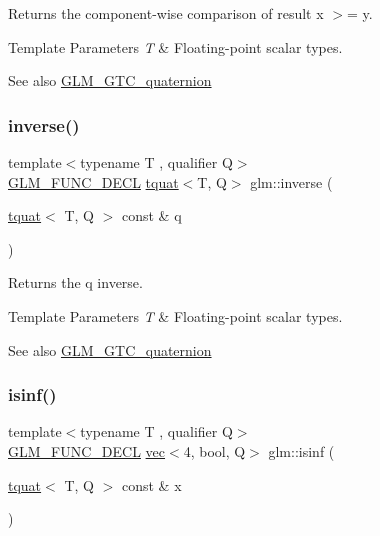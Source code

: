 Returns the component-\/wise comparison of result x $>$= y.


\begin{DoxyTemplParams}{Template Parameters}
{\em T} & Floating-\/point scalar types.\\
\hline
\end{DoxyTemplParams}
\begin{DoxySeeAlso}{See also}
\hyperlink{group__gtc__quaternion}{G\+L\+M\+\_\+\+G\+T\+C\+\_\+quaternion} 
\end{DoxySeeAlso}
\mbox{\label{group__gtc__quaternion_gadc59b59ce71daa5586a64a6acf36c072}} 
\subsubsection{\texorpdfstring{inverse()}{inverse()}}
{\footnotesize\ttfamily template$<$typename T , qualifier Q$>$ \\
\hyperlink{setup_8hpp_ab2d052de21a70539923e9bcbf6e83a51}{G\+L\+M\+\_\+\+F\+U\+N\+C\+\_\+\+D\+E\+CL} \hyperlink{structglm_1_1tquat}{tquat}$<$T, Q$>$ glm\+::inverse (\begin{DoxyParamCaption}\item[{\hyperlink{structglm_1_1tquat}{tquat}$<$ T, Q $>$ const \&}]{q }\end{DoxyParamCaption})}

Returns the q inverse.


\begin{DoxyTemplParams}{Template Parameters}
{\em T} & Floating-\/point scalar types.\\
\hline
\end{DoxyTemplParams}
\begin{DoxySeeAlso}{See also}
\hyperlink{group__gtc__quaternion}{G\+L\+M\+\_\+\+G\+T\+C\+\_\+quaternion} 
\end{DoxySeeAlso}
\mbox{\label{group__gtc__quaternion_ga139abc0f7f89553e341f8be95bf8d3cb}} 
\subsubsection{\texorpdfstring{isinf()}{isinf()}}
{\footnotesize\ttfamily template$<$typename T , qualifier Q$>$ \\
\hyperlink{setup_8hpp_ab2d052de21a70539923e9bcbf6e83a51}{G\+L\+M\+\_\+\+F\+U\+N\+C\+\_\+\+D\+E\+CL} \hyperlink{structglm_1_1vec}{vec}$<$4, bool, Q$>$ glm\+::isinf (\begin{DoxyParamCaption}\item[{\hyperlink{structglm_1_1tquat}{tquat}$<$ T, Q $>$ const \&}]{x }\end{DoxyParamCaption})}

